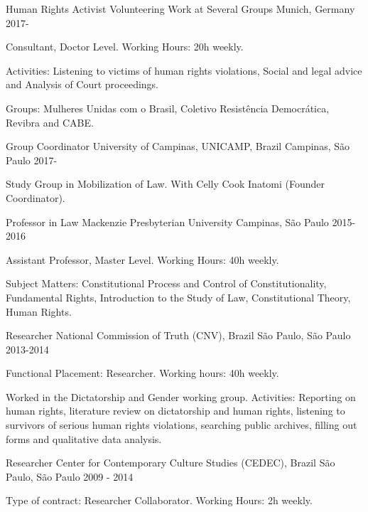 
\begin{cventries}

\cventry
{Human Rights Activist}
{Volunteering Work at Several Groups}
{Munich, Germany}
{2017-}
{
\begin{cvitems}
  \item Consultant, Doctor Level. Working Hours: 20h weekly.
  \item Activities: Listening to victims of human rights violations, Social and legal advice and Analysis of Court proceedings.
  \item Groups: Mulheres Unidas com o Brasil, Coletivo Resistência Democrática, Revibra and CABE.
\end{cvitems}
}

\cventry
{Group Coordinator}
{University of Campinas, UNICAMP, Brazil}
{Campinas, São Paulo}
{2017-}
{
\begin{cvitems}
  \item Study Group in Mobilization of Law. With Celly Cook Inatomi (Founder Coordinator).
\end{cvitems}
}

\cventry
{Professor in Law}
{Mackenzie Presbyterian University}
{Campinas, São Paulo}
{2015-2016}
{
\begin{cvitems}
  \item Assistant Professor, Master Level. Working Hours: 40h weekly.
  \item Subject Matters: Constitutional Process and Control of Constitutionality, Fundamental Rights, Introduction to the Study of Law, Constitutional Theory, Human Rights.
\end{cvitems}
}

\cventry
{Researcher}
{National Commission of Truth (CNV), Brazil}
{São Paulo, São Paulo}
{2013-2014}
{
\begin{cvitems}
  \item Functional Placement: Researcher. Working hours: 40h weekly.
  \item Worked in the Dictatorship and Gender working group. Activities: Reporting on human rights, literature review on dictatorship and human rights, listening to survivors of serious human rights violations, searching public archives, filling out forms and qualitative data analysis.
\end{cvitems}
}

\cventry
{Researcher}
{Center for Contemporary Culture Studies (CEDEC), Brazil}
{São Paulo, São Paulo}
{2009 - 2014}
{
\begin{cvitems}
  \item Type of contract: Researcher Collaborator. Working Hours: 2h weekly.
\end{cvitems}
}


\end{cventries}
